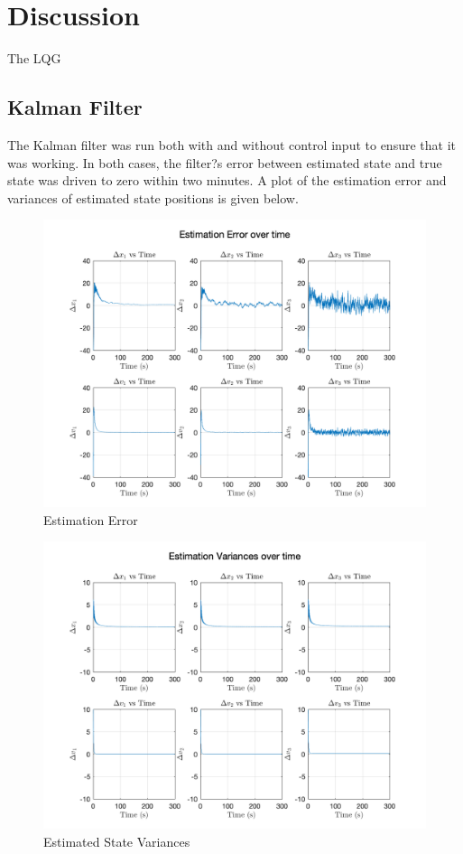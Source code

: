 \documentclass[12pt,onecolumn,reqno]{amsart}
\begin{document}
\section{Discussion}
The LQG 

\subsection{Kalman Filter}
The Kalman filter was run both with and without control input to ensure that it was working. In both cases, the filter?s error between estimated state and true state was driven to zero within two minutes. A plot of the estimation error and variances of estimated state positions is given below. 

\begin{figure}[H]
	\includegraphics[width=\linewidth]{est_error.png}
	\caption{Estimation Error}
	\label{fig:Est. Error}
\end{figure}

\begin{figure}[H]
	\includegraphics[width=\linewidth]{state_vars.png}
	\caption{Estimated State Variances}
	\label{fig:Est. State Vars}
\end{figure}
\end{document}
